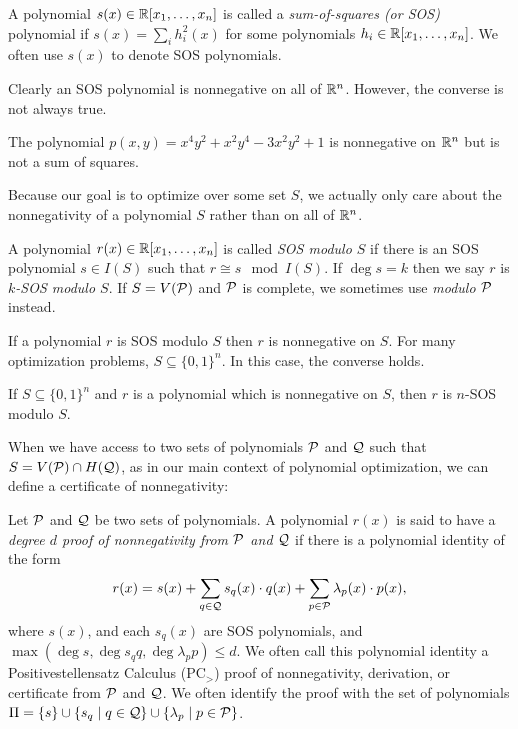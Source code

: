 \begin{definition}
A polynomial $s(x) \in \mathbb R[x_1,\dots,x_n]$ is called a \emph{sum-of-squares (or SOS)} polynomial if $s(x) = \sum_i h_i^2(x)$ for some polynomials $h_i \in \mathbb R[x_1,\dots,x_n]$. We often use $s(x)$ to denote SOS polynomials.
\end{definition}

Clearly an SOS polynomial is nonnegative on all of $\mathbb R^n$. However, the converse is not always true.
\begin{fact}
The polynomial $p(x,y) = x^4y^2 + x^2y^4 - 3x^2y^2 + 1$ is nonnegative on $\mathbb R^n$ but is not a sum of squares.
\end{fact}

Because our goal is to optimize over some set $S$, we actually only care about the nonnegativity of a polynomial $S$ rather than on all of $\mathbb R^n$.

\begin{definition}
A polynomial $r(x) \in \mathbb R[x_1,\dots,x_n]$ is called \emph{SOS modulo $S$} if there is an SOS polynomial $s \in I(S)$ such that $r \cong s \mod I(S)$. If $\deg s = k$ then we say $r$ is \emph{$k$-SOS modulo $S$}. If $S = V(\mathcal P)$ and $\mathcal P$ is complete, we sometimes use \emph{modulo $\mathcal P$} instead.
\end{definition}
If a polynomial $r$ is SOS modulo $S$ then $r$ is nonnegative on $S$. For many optimization problems, $S \subseteq \{0,1\}^n$. In this case, the converse holds.
\begin{fact}\label{fact:boolSOS}
If $S \subseteq \{0,1\}^n$ and $r$ is a polynomial which is nonnegative on $S$, then $r$ is $n$-SOS modulo $S$.
\end{fact}

When we have access to two sets of polynomials $\mathcal P$ and $\mathcal Q$ such that $S = V(\mathcal P) \cap H(\mathcal Q)$, as in our main context of polynomial optimization, we can define a certificate of nonnegativity:

\begin{definition}
Let $\mathcal P$ and $\mathcal Q$ be two sets of polynomials. A polynomial $r(x)$ is said to have a \emph{degree $d$ proof of nonnegativity from $\mathcal P$ and $\mathcal Q$} if there is a polynomial identity of the form
\[r(x) = s(x) + \sum_{q \in \mathcal Q} s_q(x) \cdot q(x) + \sum_{p \in \mathcal P} \lambda_p(x) \cdot p(x),\]
where $s(x)$, and each $s_q(x)$ are SOS polynomials, and $\max(\deg s, \deg s_qq, \deg \lambda_pp) \leq d$. We often call this polynomial identity a Positivestellensatz Calculus (PC$_>$) proof of nonnegativity, derivation, or certificate from $\mathcal P$ and $\mathcal Q$.
We often identify the proof with the set of polynomials $\Pi = \{s\} \cup \{s_q \mid q\in \mathcal Q\} \cup \{\lambda_p \mid p \in \mathcal P\}$.

\end{definition}

